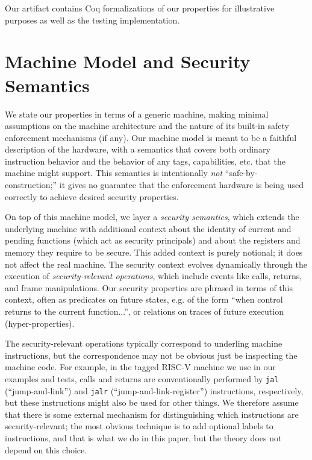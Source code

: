 \documentclass[10pt,conference]{ieeetran}%
\theoremstyle{definition}
\begin{document}
Our artifact contains Coq formalizations of our properties for illustrative purposes
as well as the testing implementation.

\section{Machine Model and Security Semantics}

  We state our properties in terms of a generic machine, making minimal assumptions
  on the machine architecture and the nature of its built-in safety enforcement mechanisms
  (if any).  Our machine model is meant to be a faithful description of the hardware,
  with a semantics that covers both ordinary instruction behavior and the behavior of
  any tags, capabilities, etc. that the machine might support. 
  This semantics is intentionally \emph{not} ``safe-by-construction;'' it gives
  no guarantee that the enforcement hardware is being used correctly to achieve desired
  security properties. 

  On top of this machine model, we layer a {\it security semantics}, which extends the
  underlying machine with additional context about the identity of current and pending
  functions (which act as security principals) and about the registers and memory they require
  to be secure. This added context is purely notional;
  it does not affect the real machine. The security context
  evolves dynamically through the execution of {\it security-relevant operations},
  which include events like calls, returns, and frame manipulations.
  Our security properties are phrased in terms of this context, often as predicates
  on future states, e.g. of the form ``when control returns to the current function...'',
  or relations on traces of future execution (hyper-properties).

  The security-relevant operations typically correspond to underling machine instructions,
  but the correspondence may not be obvious just be inspecting the machine code.
  For example, in the tagged RISC-V machine we use in our examples and tests,
  calls and returns are conventionally performed by {\tt jal} (``jump-and-link'')
  and {\tt jalr} (``jump-and-link-register'') instructions, respectively, but these
  instructions might also be used for other things. We therefore assume that there
  is some external mechanism for distinguishing which instructions are security-relevant;
  the most obvious technique is to add optional labels to instructions, and that is 
  what we do in this paper, but the theory does not depend on this choice. 
\end{document}
